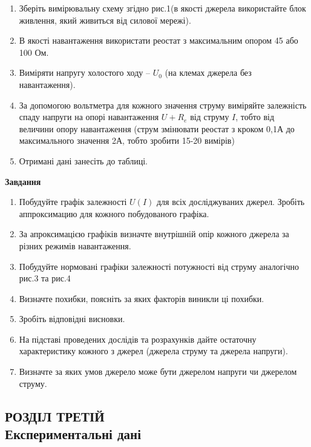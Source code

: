 \documentclass[a4paper,12pt]{article}
\newcommand{\re}{R_e}
\newcommand{\uo}{U_0}
\begin{document}
	\begin{enumerate}
		\item Зберіть вимірювальну схему згідно рис.1(в якості джерела використайте блок живлення, який живиться від силової мережі). 
		\item В якості навантаження використати реостат з максимальним опором 45 або 100 Ом. 
		\item Виміряти напругу холостого ходу – $\uo$ (на клемах джерела без навантаження). 
		\item За допомогою вольтметра для кожного значення струму виміряйте залежність спаду напруги на опорі навантаження $U+{\re}$ від струму $I$, тобто від величини опору навантаження (струм змінювати реостат з кроком 0,1А до максимального значення 2А, тобто зробити 15-20 вимірів) 
		\item Отримані дані занесіть до таблиці. 
	\end{enumerate}
	
	
	\newpage
	
	
	\begin{center}
		\textbf{Завдання}
	\end{center}
	\begin{enumerate}
		\item Побудуйте графік залежності $U(I)$ для всіх досліджуваних джерел. Зробіть аппроксимацию для кожного побудованого графіка. 
		\item За апроксимацією графіків визначте внутрішній опір кожного джерела за різних режимів навантаження. 
		\item Побудуйте нормовані графіки залежності потужності від струму аналогічно рис.3 та рис.4 
		\item Визначте похибки, поясніть за яких факторів виникли ці похибки. 
		\item Зробіть відповідні висновки. 
		\item На підставі проведених дослідів та розрахунків дайте остаточну характеристику кожного з джерел (джерела струму та джерела напруги). 
		\item Визначте за яких умов джерело може бути джерелом напруги чи джерелом струму. 
	\end{enumerate}
	
	
	\newpage
	\begin{center}
		\section* {РОЗДІЛ ТРЕТІЙ\\Експериментальні дані}
	\end{center}
	
\end{document}
